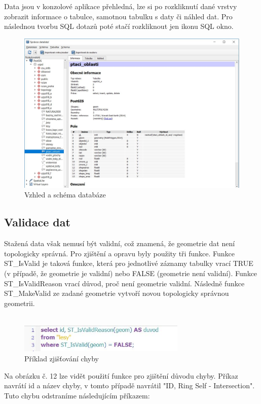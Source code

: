 \documentclass[a4paper, 12pt]{article}
\begin{document}
Data jsou v konzolové aplikace přehledná, lze si po rozkliknutí dané vrstvy zobrazit informace o tabulce, samotnou tabulku s daty či náhled dat. Pro následnou tvorbu SQL dotazů poté stačí rozkliknout jen ikonu SQL okno.

\begin{figure}[h!]
	\centering
	\includegraphics[width=12cm]{pictures/vzhled.jpg}
	\caption{Vzhled a schéma databáze}
\end{figure}

\subsection{Validace dat}
Stažená data však nemusí být validní, což znamená, že geometrie dat není topologicky správná. Pro zjištění a opravu byly použity tři funkce. Funkce ST\_IsValid je taková funkce, která pro jednotlivé záznamy tabulky vrací TRUE (v případě, že geometrie je validní) nebo FALSE (geometrie není validní). Funkce ST\_IsValidReason vrací důvod, proč není geometrie validní. Následně funkce ST\_MakeValid ze zadané geometrie vytvoří novou topologicky správnou geometrii.\\
\\
\begin{figure}[h!]
	\centering
	\includegraphics[width=8cm]{pictures/validace.jpg}
	\caption{Příklad zjišťování chyby}
\end{figure}

Na obrázku č. 12 lze vidět použití funkce pro zjištění důvodu chyby. Příkaz navrátí id a název chyby, v tomto případě navrátil "ID, Ring Self - Intersection". Tuto chybu odstraníme následujícím příkazem: \\
\end{document}
